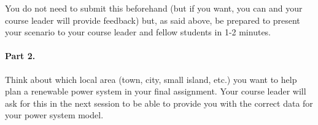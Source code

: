 You do not need to submit this beforehand (but if you want, you can and your course leader will provide feedback) but, as said above, be prepared to present your scenario to your course leader and fellow students in 1-2 minutes.

\paragraph*{Part 2.} Think about which local area (town, city, small island, etc.) you want to help plan a renewable power system in your final assignment. Your course leader will ask for this in the next session to be able to provide you with the correct data for your power system model.